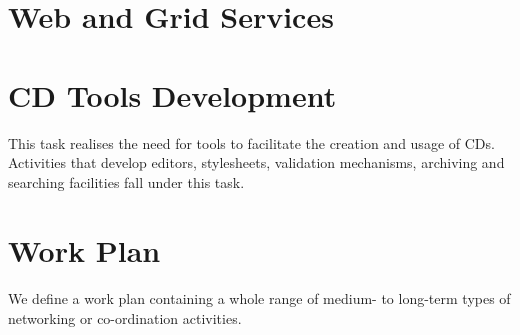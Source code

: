\documentclass[draft]{artikel3}
\begin{document}
\section{Web and Grid Services}


\section{CD Tools Development} 
\label{tools}

This task realises the need for tools to facilitate the creation and
usage of CDs. Activities that develop editors, stylesheets, validation
mechanisms, archiving and searching facilities fall under this task.



\section{Work Plan}
We define a work plan containing a
whole range of medium- to long-term types of networking or co-ordination
activities.
\end{document}
